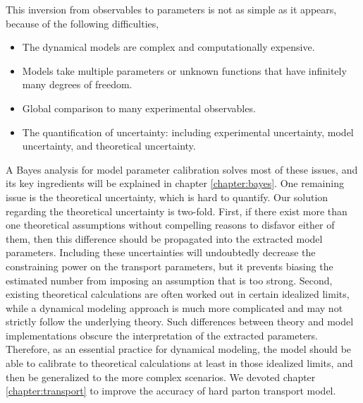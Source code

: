 This inversion from observables to parameters is not as simple as it appears, because of the following difficulties,
\begin{itemize}
\item The dynamical models are complex and computationally expensive.
\item Models take multiple parameters or unknown functions that have infinitely many degrees of freedom.
\item Global comparison to many experimental observables.
\item The quantification of uncertainty: including experimental uncertainty, model uncertainty, and theoretical uncertainty.
\end{itemize}
A Bayes analysis for model parameter calibration solves most of these issues, and its key ingredients will be explained in chapter \ref{chapter:bayes}.
One remaining issue is the theoretical uncertainty, which is hard to quantify.
Our solution regarding the theoretical uncertainty is two-fold.
First, if there exist more than one theoretical assumptions without compelling reasons to disfavor either of them, then this difference should be propagated into the extracted model parameters.
Including these uncertainties will undoubtedly decrease the constraining power on the transport parameters, but it prevents biasing the estimated number from imposing an assumption that is too strong.
Second, existing theoretical calculations are often worked out in certain idealized limits, while a dynamical modeling approach is much more complicated and may not strictly follow the underlying theory.
Such differences between theory and model implementations obscure the interpretation of the extracted parameters.
Therefore, as an essential practice for dynamical modeling, the model should be able to calibrate to theoretical calculations at least in those idealized limits, and then be generalized to the more complex scenarios.
We devoted chapter \ref{chapter:transport} to improve the accuracy of hard parton transport model.

